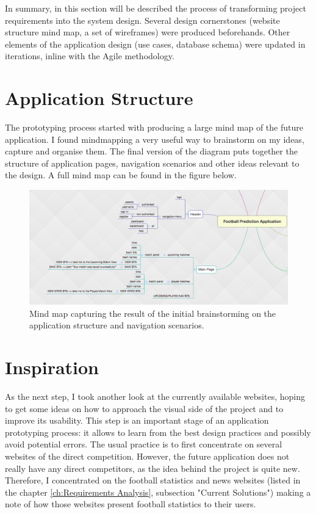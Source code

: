 In summary, in this section will be described the process of transforming project requirements into the system design. Several design cornerstones (website structure mind map, a set of wireframes) were produced beforehands. Other elements of the application design (use cases, database schema) were updated in iterations, inline with the Agile methodology. 

\section{Application Structure}
\label{sec:applicationstructure_prototype}
The prototyping process started with producing a large mind map of the future application.  I found mindmapping a very useful way to brainstorm on my ideas, capture and organise them. The final version of the diagram puts together the structure of application pages, navigation scenarios and other ideas relevant to the design. A full mind map can be found in the figure below.

\begin{figure}[H]
	\begin{center}
		\includegraphics[width=.90\textwidth]{design/images/mindmap}
		\caption{Mind map capturing the result of the initial brainstorming on the application structure and navigation scenarios.} \label{fig:using:mindmap}
	\end{center}
\end{figure}

\section{Inspiration}
\label{sec:inspiration_prototype}
As the next step, I took another look at the currently available websites, hoping to get some ideas on how to approach the visual side of the project and to improve its usability. This step is an important stage of an application prototyping process: it allows to learn from the best design practices and possibly avoid potential errors. The usual practice is to first concentrate on several websites of the direct competition. However, the future application does not really have any direct competitors, as the idea behind the project is quite new. Therefore, I concentrated on the football statistics and news websites (listed in the chapter \ref{ch:Requirements Analysis}, subsection "Current Solutions") making a note of how those websites present football statistics to their users.

